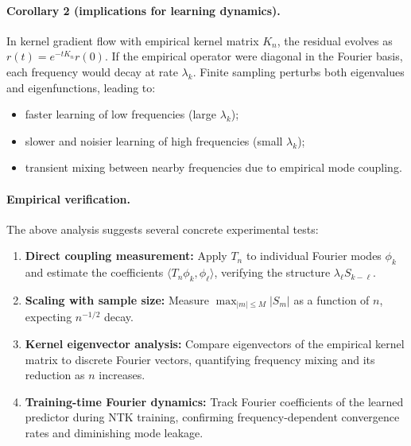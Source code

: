 \paragraph{Corollary 2 (implications for learning dynamics).}
In kernel gradient flow with empirical kernel matrix \(K_n\),
the residual evolves as \(r(t)=e^{-tK_n} r(0)\).
If the empirical operator were diagonal in the Fourier basis, each frequency would decay at rate
\(\lambda_k\).
Finite sampling perturbs both eigenvalues and eigenfunctions, leading to:
\begin{itemize}
	\item faster learning of low frequencies (large \(\lambda_k\));
	\item slower and noisier learning of high frequencies (small \(\lambda_k\));
	\item transient mixing between nearby frequencies due to empirical mode coupling.
\end{itemize}

\paragraph{Empirical verification.}
The above analysis suggests several concrete experimental tests:
\begin{enumerate}
	\item \textbf{Direct coupling measurement:}
	      Apply \(T_n\) to individual Fourier modes \(\phi_k\) and estimate the coefficients
	      \(\langle T_n\phi_k,\phi_\ell\rangle\), verifying the structure \(\lambda_\ell S_{k-\ell}\).
	\item \textbf{Scaling with sample size:}
	      Measure \(\max_{|m|\le M} |S_m|\) as a function of \(n\), expecting \(n^{-1/2}\) decay.
	\item \textbf{Kernel eigenvector analysis:}
	      Compare eigenvectors of the empirical kernel matrix to discrete Fourier vectors,
	      quantifying frequency mixing and its reduction as \(n\) increases.
	\item \textbf{Training-time Fourier dynamics:}
	      Track Fourier coefficients of the learned predictor during NTK training, confirming
	      frequency-dependent convergence rates and diminishing mode leakage.
\end{enumerate}
